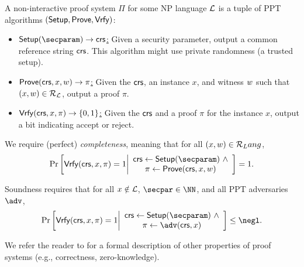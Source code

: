 \begin{definition} A non-interactive proof system $\Pi$ for some NP language $\mathcal{L}$ is a tuple of PPT algorithms $(\mathsf{Setup}, \mathsf{Prove}, \mathsf{Vrfy})$:
    \begin{itemize}
        \item \underline{$\setup(\secparam) \rightarrow \crs$:} Given a security parameter, output a common reference string $\mathsf{crs}$. This algorithm might use private randomness (a trusted setup).
        \item \underline{$\mathsf{Prove}(\mathsf{crs}, x, w) \rightarrow \pi$:} Given the $\mathsf{crs}$, an instance $x$, and witness $w$ such that $(x, w) \in \mathcal{R}_{\mathcal{L}}$, output a proof $\pi$.
        \item \underline{$\mathsf{Vrfy}(\mathsf{crs}, x,\pi) \rightarrow \{0,1\}$:} Given the $\mathsf{crs}$ and a proof $\pi$ for the instance $x$, output a bit indicating accept or reject.
    \end{itemize}

We require (perfect) \emph{completeness}, meaning that for all $(x,w) \in \mathcal{R}_Lang$,
\begin{equation*}
    \Pr\left[
        \vrfy(\crs, x, \pi)=1 
        \middle| 
        \begin{array}{c}
            \crs \gets \setup(\secparam)~\land\\
            \pi \gets \prove(\crs, x, \witness)
        \end{array}
    \right] = 1.
\end{equation*}
\end{definition}

\begin{definition}[soundness] Soundness requires that for all $x \notin \mathcal{L}$, $\secpar \in \NN$, and all PPT adversaries $\adv$,
\begin{equation*}
    \Pr\left[
        \vrfy(\crs, x, \pi)=1 
        \middle| 
        \begin{array}{c}
            \crs \gets \setup(\secparam)~\land\\
            \pi \gets \adv(\crs, x)
        \end{array}
    \right] \leq \negl.
\end{equation*}
\end{definition}

We refer the reader to \cite{Thaler23,GoldreichFoC} for a formal description of other properties of proof systems (e.g., correctness, zero-knowledge). 

